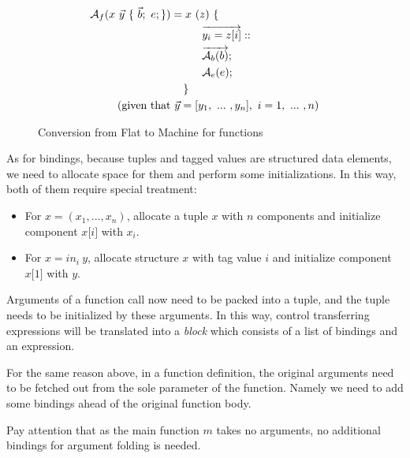 \documentclass{article}
\theoremstyle{definition}
\theoremstyle{remark}
\numberwithin{equation}{section}
\begin{document}
\begin{figure}[!ht]
  \centering
\begin{align*}
\mathcal{A}_f(x\ \vec{y}\ \{\ \vec{b};\ e; \})
    &= x\ (z)\ \{\\
    &\kern1cm \overrightarrow{y_i=z[i]}::\\
    &\kern1cm \overrightarrow{\mathcal{A}_b(b)};\\
    &\kern1cm \mathcal{A}_e(e); \\
    &\kern0.4cm \}\\
    (\textrm{given that}&\ \vec{y}=[y_1,\ ...\ , y_n],\ i =1,\ ...\ ,n)
\end{align*}
  \caption{Conversion from Flat to Machine for functions}
  \label{fig-sub}
\end{figure}

As for bindings, because tuples and tagged values are structured data elements,
we need to allocate space for them and perform some initializations. In this way,
both of them require special treatment:
\begin{itemize}
  \item For $x=(x_1, ..., x_n)$, allocate a tuple $x$ with $n$ components and initialize
    component $x\texttt{[}i\texttt{]}$ with $x_i$.
  \item For $x=in_i\ y$, allocate structure $x$ with tag value $i$ and initialize
    component $x\texttt{[}1\texttt{]}$ with $y$.
\end{itemize}

Arguments of a function call now need to be packed
into a tuple, and the tuple needs to be initialized by these arguments. In this way,
 control transferring expressions will be translated into a \textit{block} which
 consists of a list of bindings and an expression.

For the same reason above, in a function definition, the original arguments
need to be fetched out from the sole parameter of the function. Namely we
need to add some bindings ahead of the original function body.

Pay attention that as the main function $m$ takes no arguments, no additional
bindings for argument folding is needed.

$\ $\\

\end{document}
